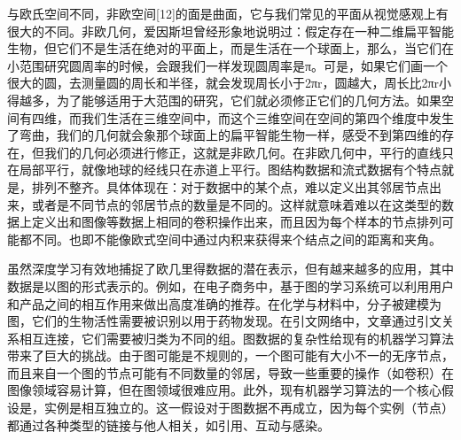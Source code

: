 \documentclass[10pt,journal,compsoc]{IEEEtran}
\begin{document}
与欧氏空间不同，非欧空间[12]的面是曲面，它与我们常见的平面从视觉感观上有很大的不同。非欧几何，爱因斯坦曾经形象地说明过：假定存在一种二维扁平智能生物，但它们不是生活在绝对的平面上，而是生活在一个球面上，那么，当它们在小范围研究圆周率的时候，会跟我们一样发现圆周率是π。可是，如果它们画一个很大的圆，去测量圆的周长和半径，就会发现周长小于2πr，圆越大，周长比2πr小得越多，为了能够适用于大范围的研究，它们就必须修正它们的几何方法。如果空间有四维，而我们生活在三维空间中，而这个三维空间在空间的第四个维度中发生了弯曲，我们的几何就会象那个球面上的扁平智能生物一样，感受不到第四维的存在，但我们的几何必须进行修正，这就是非欧几何。在非欧几何中，平行的直线只在局部平行，就像地球的经线只在赤道上平行。图结构数据和流式数据有个特点就是，排列不整齐。具体体现在：对于数据中的某个点，难以定义出其邻居节点出来，或者是不同节点的邻居节点的数量是不同的。这样就意味着难以在这类型的数据上定义出和图像等数据上相同的卷积操作出来，而且因为每个样本的节点排列可能都不同。也即不能像欧式空间中通过内积来获得来个结点之间的距离和夹角。

​	虽然深度学习有效地捕捉了欧几里得数据的潜在表示，但有越来越多的应用，其中数据是以图的形式表示的。例如，在电子商务中，基于图的学习系统可以利用用户和产品之间的相互作用来做出高度准确的推荐。在化学与材料中，分子被建模为图，它们的生物活性需要被识别以用于药物发现。在引文网络中，文章通过引文关系相互连接，它们需要被归类为不同的组。图数据的复杂性给现有的机器学习算法带来了巨大的挑战。由于图可能是不规则的，一个图可能有大小不一的无序节点，而且来自一个图的节点可能有不同数量的邻居，导致一些重要的操作（如卷积）在图像领域容易计算，但在图领域很难应用。此外，现有机器学习算法的一个核心假设是，实例是相互独立的。这一假设对于图数据不再成立，因为每个实例（节点）都通过各种类型的链接与他人相关，如引用、互动与感染。
\end{document}

